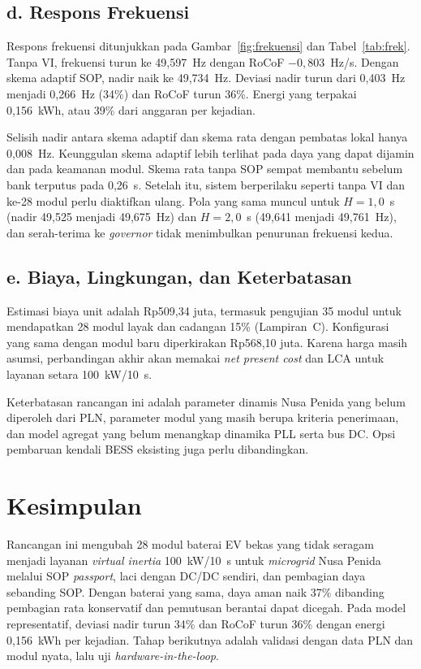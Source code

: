 \documentclass[12pt,a4paper,twocolumn]{article}
\newcommand{\eng}[1]{\textit{#1}}
\begin{document}
\subsection{d. Respons Frekuensi}
Respons frekuensi ditunjukkan pada Gambar~\ref{fig:frekuensi} dan Tabel~\ref{tab:frek}. Tanpa VI, frekuensi turun ke 49,597~Hz dengan RoCoF $-0{,}803$~Hz/s. Dengan skema adaptif SOP, nadir naik ke 49,734~Hz. Deviasi nadir turun dari 0,403~Hz menjadi 0,266~Hz (34\%) dan RoCoF turun 36\%. Energi yang terpakai 0,156~kWh, atau 39\% dari anggaran per kejadian.

Selisih nadir antara skema adaptif dan skema rata dengan pembatas lokal hanya 0,008~Hz. Keunggulan skema adaptif lebih terlihat pada daya yang dapat dijamin dan pada keamanan modul. Skema rata tanpa SOP sempat membantu sebelum bank terputus pada 0,26~s. Setelah itu, sistem berperilaku seperti tanpa VI dan ke-28 modul perlu diaktifkan ulang. Pola yang sama muncul untuk $H=1{,}0$~s (nadir 49,525 menjadi 49,675~Hz) dan $H=2{,}0$~s (49,641 menjadi 49,761~Hz), dan serah-terima ke \eng{governor} tidak menimbulkan penurunan frekuensi kedua.

\subsection{e. Biaya, Lingkungan, dan Keterbatasan}
Estimasi biaya unit adalah Rp509,34 juta, termasuk pengujian 35 modul untuk mendapatkan 28 modul layak dan cadangan 15\% (Lampiran~C). Konfigurasi yang sama dengan modul baru diperkirakan Rp568,10 juta. Karena harga masih asumsi, perbandingan akhir akan memakai \eng{net present cost} dan LCA untuk layanan setara 100~kW/10~s.

Keterbatasan rancangan ini adalah parameter dinamis Nusa Penida yang belum diperoleh dari PLN, parameter modul yang masih berupa kriteria penerimaan, dan model agregat yang belum menangkap dinamika PLL serta bus DC. Opsi pembaruan kendali BESS eksisting juga perlu dibandingkan.

\section{Kesimpulan}
Rancangan ini mengubah 28 modul baterai EV bekas yang tidak seragam menjadi layanan \eng{virtual inertia} 100~kW/10~s untuk \eng{microgrid} Nusa Penida melalui SOP \eng{passport}, laci dengan DC/DC sendiri, dan pembagian daya sebanding SOP. Dengan baterai yang sama, daya aman naik 37\% dibanding pembagian rata konservatif dan pemutusan berantai dapat dicegah. Pada model representatif, deviasi nadir turun 34\% dan RoCoF turun 36\% dengan energi 0,156~kWh per kejadian. Tahap berikutnya adalah validasi dengan data PLN dan modul nyata, lalu uji \eng{hardware-in-the-loop}.
\end{document}
